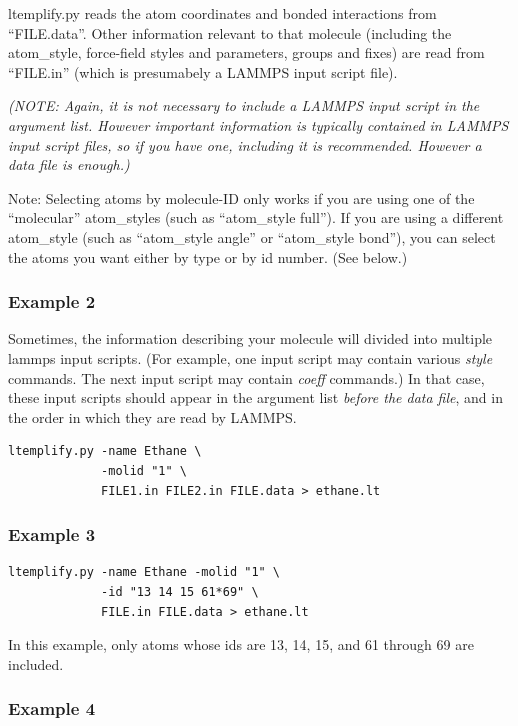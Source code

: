 \documentclass[11pt]{article}
\begin{document}
ltemplify.py reads the atom coordinates and bonded interactions from
``FILE.data''.
Other information relevant to that molecule (including the atom\_style,
force-field styles and parameters, groups and fixes)
are read from ``FILE.in'' (which is presumabely a LAMMPS input script file).

\textit{(NOTE: Again, it is not necessary to include a LAMMPS input script in
        the argument list.  However important information is typically
        contained in LAMMPS input script files, so if you have one, including
        it is recommended.  However a data file is enough.)}

Note: Selecting atoms by molecule-ID only works if you are using
one of the ``molecular'' atom\_styles (such as ``atom\_style full'').
If you are using a different atom\_style
(such as ``atom\_style angle'' or ``atom\_style bond''),
you can select the atoms you want either by type or by id number.
(See below.)



\subsubsection*{Example 2}
Sometimes, the information describing your molecule will divided
into multiple lammps input scripts.
(For example, one input script may contain various \textit{style} commands.
 The next input script may contain \textit{coeff} commands.)
In that case, these input scripts should appear
in the argument list \textit{before the data file},
and in the order in which they are read by LAMMPS.
\begin{verbatim}
ltemplify.py -name Ethane \
             -molid "1" \
             FILE1.in FILE2.in FILE.data > ethane.lt
\end{verbatim}


\subsubsection*{Example 3}

\begin{verbatim}
ltemplify.py -name Ethane -molid "1" \
             -id "13 14 15 61*69" \
             FILE.in FILE.data > ethane.lt
\end{verbatim}

    In this example, only atoms whose ids are 
    13, 14, 15, and 61 through 69 are included.

\subsubsection*{Example 4}
\end{document}

